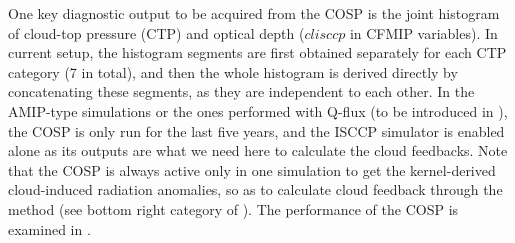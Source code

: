 One key diagnostic output to be acquired from the COSP is the joint histogram of cloud-top pressure (CTP) and optical depth ($clisccp$ in CFMIP variables). In current setup, the histogram segments are first obtained separately for each CTP category (7 in total), and then the whole histogram is derived directly by concatenating these segments, as they are independent to each other. In the AMIP-type simulations or the ones performed with Q-flux (to be introduced in ), the COSP is only run for the last five years, and the ISCCP simulator is enabled alone as its outputs are what we need here to calculate the cloud feedbacks. Note that the COSP is always active only in one simulation to get the kernel-derived cloud-induced radiation anomalies, so as to calculate cloud feedback through the \cite{Gregory2004} method  (see bottom right category of ). The performance of the COSP is examined in .





